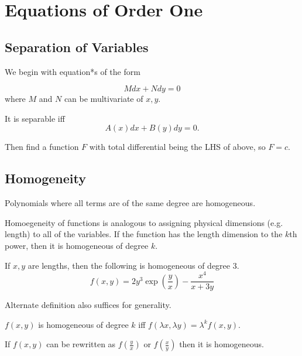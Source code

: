 \section{Equations of Order One}

\subsection{Separation of Variables}

We begin with equation*s of the form

\begin{equation*}
    Mdx+Ndy=0
\end{equation*}
where $M$ and $N$ can be multivariate of $x,y$.

It is separable iff
\begin{equation*}
    A(x)dx+B(y)dy=0.
\end{equation*}

Then find a function $F$ with total differential being the LHS of above, so $F=c$.

\subsection{Homogeneity}

\begin{definition}
    Polynomials where all terms are of the same degree are homogeneous.
\end{definition}

Homoegeneity of functions is analogous to assigning physical dimensions (e.g. length) to all of the variables.
If the function has the length dimension to the $k$th power, then it is homogeneous of degree $k$.

\begin{example}
    If $x,y$ are lengths, then the following is homogeneous of degree 3.
    \begin{equation*}
        f(x,y)=2y^3\exp(\frac{y}{x})-\frac{x^4}{x+3y}
    \end{equation*}
\end{example}

Alternate definition also suffices for generality.

\begin{definition}
    $f(x,y)$ is homogeneous of degree $k$ iff $f(\lambda x, \lambda y)=\lambda^kf(x,y)$.
\end{definition}

\begin{definition}
    If $f(x,y)$ can be rewritten as $f(\frac{y}{x})$ or $f(\frac{x}{y})$ then it is homogeneous.
\end{definition}

